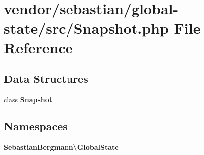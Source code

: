 \section{vendor/sebastian/global-\/state/src/\+Snapshot.php File Reference}
\label{_snapshot_8php}
\subsection*{Data Structures}
\begin{DoxyCompactItemize}
\item 
class {\bf Snapshot}
\end{DoxyCompactItemize}
\subsection*{Namespaces}
\begin{DoxyCompactItemize}
\item 
 {\bf Sebastian\+Bergmann\textbackslash{}\+Global\+State}
\end{DoxyCompactItemize}
